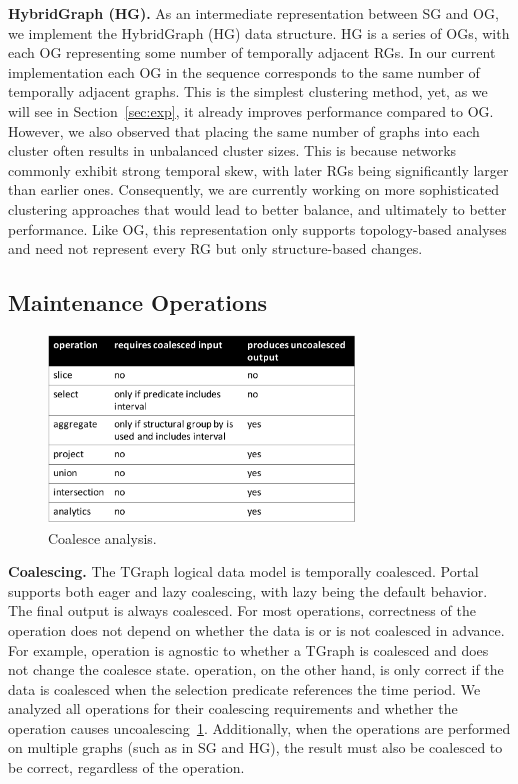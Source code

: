 {\bf HybridGraph (HG).} As an intermediate representation between SG
and OG, we implement the HybridGraph (HG) data structure.  HG is a
series of OGs, with each OG representing some number of temporally
adjacent RGs.  In our current implementation each OG in the sequence
corresponds to the same number of temporally adjacent graphs.  This is
the simplest clustering method, yet, as we will see in
Section~\ref{sec:exp}, it already improves performance compared to OG.
However, we also observed that placing the same number of graphs into
each cluster often results in unbalanced cluster sizes.  This is
because networks commonly exhibit strong temporal skew, with later RGs
being significantly larger than earlier ones.  Consequently, we are
currently working on more sophisticated clustering approaches that
would lead to better balance, and ultimately to better performance.
Like OG, this representation only supports topology-based analyses and
need not represent every RG but only structure-based changes.

\subsection{Maintenance Operations}
\label{sec:sys:maint}

\begin{figure}
\includegraphics[width=3.2in]{figs/coalesce.pdf}
\caption{Coalesce analysis.}
\label{fig:coalesce}
\end{figure}

{\bf Coalescing.}  The TGraph logical data model is temporally
coalesced.  Portal supports both eager and lazy coalescing, with lazy
being the default behavior.  The final output is always coalesced.
For most operations, correctness of the operation does not depend on
whether the data is or is not coalesced in advance.  For example,
 operation is agnostic to whether a TGraph is coalesced
and does not change the coalesce state.   operation, on
the other hand, is only correct if the data is coalesced when the
selection predicate references the time period.  We analyzed all
operations for their coalescing requirements and whether the operation
causes uncoalescing~\ref{fig:coalesce}.  Additionally, when the
operations are performed on multiple graphs (such as in SG and HG),
the result must also be coalesced to be correct, regardless of the
operation.

